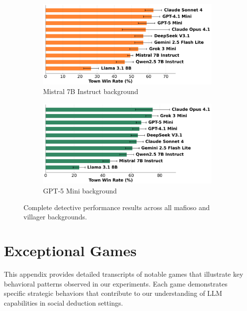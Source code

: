 \documentclass{article}
\begin{document}
\begin{figure}[htbp]
    \begin{subfigure}[b]{0.48\textwidth}
        \centering
        \includegraphics[width=\textwidth]{../results/detective_mistral_7b_instruct_db_benchmark.png}
        \caption{Mistral 7B Instruct background}
        \label{fig:detective_mistral_appendix}
    \end{subfigure}
    \hfill
    \begin{subfigure}[b]{0.48\textwidth}
        \centering
        \includegraphics[width=\textwidth]{../results/detective_gpt-5_mini_db_benchmark.png}
        \caption{GPT-5 Mini background}
        \label{fig:detective_gpt5mini_appendix}
    \end{subfigure}
    \caption{Complete detective performance results across all mafioso and villager backgrounds.}
    \label{fig:detective_complete}
\end{figure}

\section{Exceptional Games}
\label{appendix:exceptional_games}

This appendix provides detailed transcripts of notable games that illustrate key behavioral patterns observed in our experiments. Each game demonstrates specific strategic behaviors that contribute to our understanding of LLM capabilities in social deduction settings.
\end{document}
